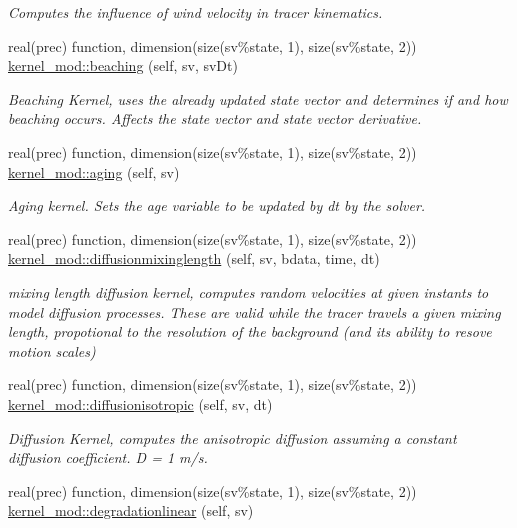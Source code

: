 \begin{DoxyCompactItemize}
\begin{DoxyCompactList}\small\item\em Computes the influence of wind velocity in tracer kinematics. \end{DoxyCompactList}\item 
real(prec) function, dimension(size(sv\%state, 1), size(sv\%state, 2)) \mbox{\hyperlink{namespacekernel__mod_ad243eaeb4e5d667795477e81ce6136c9}{kernel\+\_\+mod\+::beaching}} (self, sv, sv\+Dt)
\begin{DoxyCompactList}\small\item\em Beaching Kernel, uses the already updated state vector and determines if and how beaching occurs. Affects the state vector and state vector derivative. \end{DoxyCompactList}\item 
real(prec) function, dimension(size(sv\%state, 1), size(sv\%state, 2)) \mbox{\hyperlink{namespacekernel__mod_ac2352f3964b072607ed042e70a59b9f2}{kernel\+\_\+mod\+::aging}} (self, sv)
\begin{DoxyCompactList}\small\item\em Aging kernel. Sets the age variable to be updated by dt by the solver. \end{DoxyCompactList}\item 
real(prec) function, dimension(size(sv\%state, 1), size(sv\%state, 2)) \mbox{\hyperlink{namespacekernel__mod_a065d7965d3a572a524cfd6bdd4729898}{kernel\+\_\+mod\+::diffusionmixinglength}} (self, sv, bdata, time, dt)
\begin{DoxyCompactList}\small\item\em mixing length diffusion kernel, computes random velocities at given instants to model diffusion processes. These are valid while the tracer travels a given mixing length, propotional to the resolution of the background (and its ability to resove motion scales) \end{DoxyCompactList}\item 
real(prec) function, dimension(size(sv\%state, 1), size(sv\%state, 2)) \mbox{\hyperlink{namespacekernel__mod_a92805ef71e30527b27de4efd7561f8f7}{kernel\+\_\+mod\+::diffusionisotropic}} (self, sv, dt)
\begin{DoxyCompactList}\small\item\em Diffusion Kernel, computes the anisotropic diffusion assuming a constant diffusion coefficient. D = 1 m/s. \end{DoxyCompactList}\item 
real(prec) function, dimension(size(sv\%state, 1), size(sv\%state, 2)) \mbox{\hyperlink{namespacekernel__mod_a43899c5dd3f82ed3dc4aade9aefd7a44}{kernel\+\_\+mod\+::degradationlinear}} (self, sv)

\end{DoxyCompactItemize}

